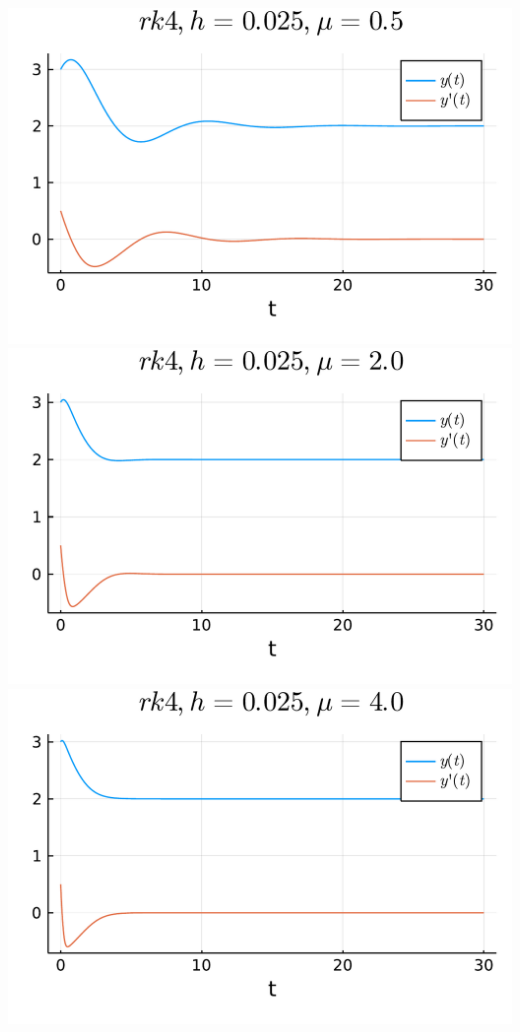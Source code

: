\documentclass[12pt,a4paper]{article}
\begin{document}
\includegraphics[width=\linewidth]{figures/ass_2_report_2_1.pdf}
\includegraphics[width=\linewidth]{figures/ass_2_report_2_2.pdf}
\includegraphics[width=\linewidth]{figures/ass_2_report_2_3.pdf}
\end{document}
